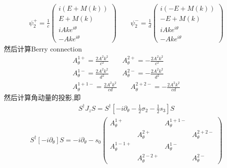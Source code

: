 \documentclass[22pt]{article}
\begin{document}
\begin{align}
		\psi_{2}^+=
		\frac{1}{c}
	\begin{pmatrix}
		i(E+M(k))\\
		E+M(k)\\
		iAke^{i\theta}\\
		-Ake^{i\theta}
	\end{pmatrix}
\qquad
\psi_{2}^-=
\frac{1}{d}
\begin{pmatrix}
	i(-E+M(k))\\
	-E+M(k)\\
	iAke^{i\theta}\\
	-Ake^{i\theta}
\end{pmatrix}
\end{align}
然后计算Berry connection 
\begin{align}
	A_{\theta}^{1+}=\frac{2A^2k^2}{c^2}
		\qquad   
		A_{\theta}^{2+}=-\frac{2A^2k^2}{c^2}\\
		A_{\theta}^{1-}=\frac{2A^2k^2}{d^2}
		\qquad
		A_{\theta}^{2-}=-\frac{2A^2k^2}{d^2}\\
		A_{\theta}^{1+1-}=\frac{2A^2k^2}{cd}
		\qquad
		A_{\theta}^{2+2-}=-\frac{2A^2k^2}{cd}
\end{align}
然后计算角动量的投影,即
\begin{align}
	S^{\dagger}J_zS=S^{\dagger}[-i\partial_{\theta}-\frac{1}{2}\sigma_2-\frac{1}{2}s_3]S
\end{align}
\begin{align}
	S^{\dagger}[-i\partial_{\theta}]S=-i\partial_{\theta}-s_0
	\begin{pmatrix}
		A_{\theta}^{1+} &&A_{\theta}^{1+1-}&\\
		&A_{\theta}^{2+}&&A_{\theta}^{2+2-}\\
		A_{\theta}^{1-1+}&&A_{\theta}^{1-}&\\
		&A_{\theta}^{2-2+}&&A_{\theta}^{2-}
	\end{pmatrix}
\end{align}
\end{document}

